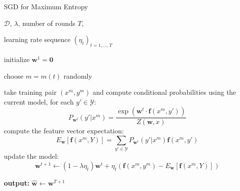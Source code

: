 \begin{algorithm}[t]

   \caption{SGD for Maximum Entropy \label{alg:maxent_sgd}}

\begin{algorithmic}[1]

    $\mathcal{D}$, $\lambda$, number of rounds $T$,

   learning rate sequence $(\eta_t)_{t = 1,\ldots,T}$

   \STATE initialize $\boldsymbol{w}^1 = \mathbf{0}$

	\STATE choose $m = m(t)$ randomly

	\STATE take training pair $(x^m, y^m)$ and compute conditional probabilities using the current model, for each $y' \in \mathcal{Y}$:
	$$P_{\boldsymbol{w}^t}(y'|x^m) = \frac{\exp(\boldsymbol{w}^t \cdot \boldsymbol{f}(x^m,y'))}{Z(\boldsymbol{w},x)}$$ 
	\STATE compute the feature vector expectation:  
	$$E_{\boldsymbol{w}}[\boldsymbol{f}(x^m,Y)] = \sum_{y' \in \mathcal{Y}} P_{\boldsymbol{w}^t}(y'|x^m) \boldsymbol{f}(x^m,y')$$
	\STATE update the model: 
	$$\boldsymbol{w}^{t+1} \leftarrow (1-\lambda \eta_t) \boldsymbol{w}^{t} + \eta_t \left( \boldsymbol{f}(x^{m},y^{m}) 
	- E_{\boldsymbol{w}}[\boldsymbol{f}(x^{m},Y)]\right)$$
	\ENDFOR

   \STATE \textbf{output:} $\hat{\boldsymbol{w}} \leftarrow \boldsymbol{w}^{T+1}$

\end{algorithmic}

\end{algorithm}





